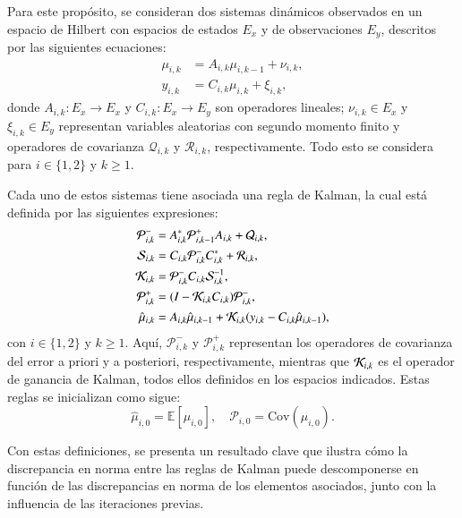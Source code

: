 Para este propósito, se consideran dos sistemas dinámicos observados en un espacio de Hilbert con espacios de estados $E_x$ y de observaciones $E_y$, descritos por las siguientes ecuaciones:  
\begin{equation*}
	\begin{aligned}
		\mu_{i,k}  &= A_{i,k} \mu_{i,k-1} + \nu_{i,k}, \\
		y_{i,k} &= C_{i,k} \mu_{i,k} + \xi_{i,k},
	\end{aligned}
\end{equation*}
donde $A_{i,k} : E_x \to E_x$ y $C_{i,k}: E_x \to E_y$ son operadores lineales; $\nu_{i,k} \in E_x$ y $\xi_{i,k} \in E_y$ representan variables aleatorias con segundo momento finito y operadores de covarianza $\mathcal{Q}_{i,k}$ y $\mathcal{R}_{i,k}$, respectivamente. Todo esto se considera para $i \in \{1,2\}$ y $k \geq 1$.

Cada uno de estos sistemas tiene asociada una regla de Kalman, la cual está definida por las siguientes expresiones:  
\begin{equation*}
	\begin{aligned}
		\mathcal{P}_{i,k}^- &= A_{i,k}^* \mathcal{P}_{i,k-1}^+ A_{i,k} + \mathcal{Q}_{i,k}, \\
		\mathcal{S}_{i,k} &= C_{i,k} \mathcal{P}_{i,k}^- C_{i,k}^* + \mathcal{R}_{i,k}, \\
		\mathcal{K}_{i,k} &= \mathcal{P}_{i,k}^- C_{i,k} \mathcal{S}_{i,k}^{-1}, \\
		\mathcal{P}_{i,k}^+ &= (I - \mathcal{K}_{i,k} C_{i,k}) \mathcal{P}_{i,k}^-, \\
		\hat{\mu}_{i,k} &= A_{i,k} \hat{\mu}_{i,k-1} + \mathcal{K}_{i,k} (y_{i,k} - C_{i,k} \hat{\mu}_{i,k-1}),
	\end{aligned}
\end{equation*}
con $i \in \{1,2\}$ y $k \geq 1$. Aquí, $\mathcal{P}_{i,k}^-$ y $\mathcal{P}_{i,k}^+$ representan los operadores de covarianza del error a priori y a posteriori, respectivamente, mientras que $\mathcal{K}_{i,k}$ es el operador de ganancia de Kalman, todos ellos definidos en los espacios indicados. Estas reglas se inicializan como sigue:
\begin{equation*}
	\hat{\mu}_{i,0} = \mathbb{E}[\mu_{i,0}], \quad \mathcal{P}_{i,0} = \text{Cov}(\mu_{i,0}).
\end{equation*}

Con estas definiciones, se presenta un resultado clave que ilustra cómo la discrepancia en norma entre las reglas de Kalman puede descomponerse en función de las discrepancias en norma de los elementos asociados, junto con la influencia de las iteraciones previas.


